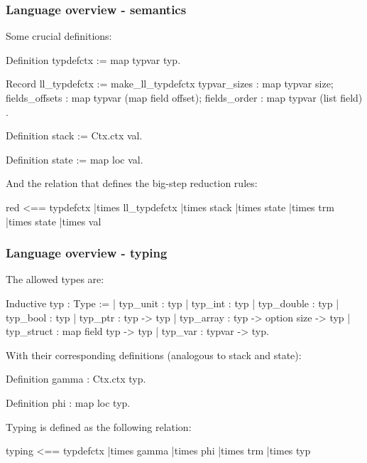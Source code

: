 \begin{frame}[fragile]
\frametitle{Language overview - semantics}




Some crucial definitions:

\begin{coqs}
  Definition typdefctx := map typvar typ.

  Record ll_typdefctx := make_ll_typdefctx {
    typvar_sizes				: map typvar size;
    fields_offsets	: map typvar (map field offset);
    fields_order				: map typvar (list field) }.
  
  Definition stack := Ctx.ctx val.

  Definition state := map loc val.
\end{coqs}

\bigskip

And the relation that defines the big-step reduction rules:

\begin{coqs}
  red 	<==		typdefctx |times 	ll_typdefctx |times 	stack |times 	state |times 	trm |times	state |times	val
\end{coqs}

\end{frame}


\begin{frame}[fragile]
\frametitle{Language overview - typing}

The allowed types are:

\begin{coqs}
  Inductive typ : Type :=
    | typ_unit : typ
    | typ_int : typ
    | typ_double : typ
    | typ_bool : typ
    | typ_ptr : typ -> typ
    | typ_array : typ -> option size -> typ
    | typ_struct : map field typ -> typ
    | typ_var : typvar -> typ.
\end{coqs}

\bigskip

With their corresponding definitions (analogous to stack and state):

\begin{coqs}
  Definition gamma : Ctx.ctx typ.

  Definition phi : map loc typ.
\end{coqs}

\bigskip

Typing is defined as the following relation:

\begin{coqs}
  typing		<==		typdefctx |times 	gamma |times 	phi |times 	trm |times	typ
\end{coqs}

\end{frame}


